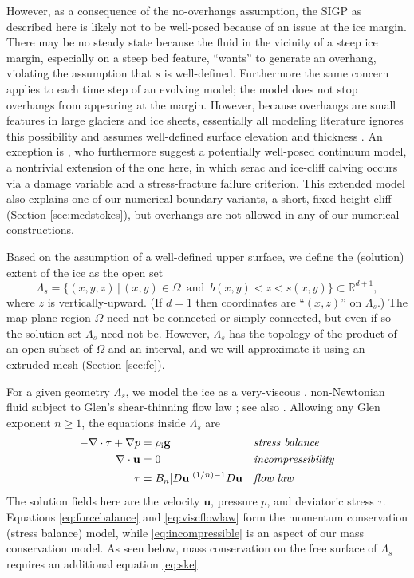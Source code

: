 \documentclass[letterpaper,final,12pt,reqno]{amsart}
\theoremstyle{claim}
\newcommand{\RR}{\mathbb{R}}
\newcommand{\bg}{\mathbf{g}}
\newcommand{\bu}{\mathbf{u}}
\newcommand{\rhoi}{\rho_{\text{i}}}
\numberwithin{equation}{section}
\numberwithin{figure}{section}
\numberwithin{table}{section}
\numberwithin{theorem}{section}
\begin{document}
However, as a consequence of the no-overhangs assumption, the SIGP as described here is likely not to be well-posed because of an issue at the ice margin.  There may be no steady state because the fluid in the vicinity of a steep ice margin, especially on a steep bed feature, ``wants'' to generate an overhang, violating the assumption that $s$ is well-defined.  Furthermore the same concern applies to each time step of an evolving model; the model does not stop overhangs from appearing at the margin.  However, because overhangs are small features in large glaciers and ice sheets, essentially all modeling literature ignores this possibility and assumes well-defined surface elevation and thickness \cite{Jouvetetal2008,Lengetal2012,WirbelJarosch2020}.  An exception is \cite{PralongFunk2005}, who furthermore suggest a potentially well-posed continuum model, a nontrivial extension of the one here, in which serac and ice-cliff calving occurs via a damage variable and a stress-fracture failure criterion.  This extended model also explains one of our numerical boundary variants, a short, fixed-height cliff (Section \ref{sec:mcdstokes}), but overhangs are not allowed in any of our numerical constructions.

Based on the assumption of a well-defined upper surface, we define the (solution) extent of the ice as the open set
\begin{equation}
\Lambda_s = \{(x,y,z)\,|\,(x,y) \in \Omega \,\text{ and }\, b(x,y) < z < s(x,y)\}  \subset \RR^{d+1}, \label{eq:lambdas}
\end{equation}
where $z$ is vertically-upward.  (If $d=1$ then coordinates are ``$(x,z)$'' on $\Lambda_s$.)  The map-plane region $\Omega$ need not be connected or simply-connected, but even if so the solution set $\Lambda_s$ need not be.  However, $\Lambda_s$ has the topology of the product of an open subset of $\Omega$ and an interval, and we will approximate it using an extruded mesh (Section \ref{sec:fe}).

For a given geometry $\Lambda_s$, we model the ice as a very-viscous \cite{Acheson1990}, non-Newtonian fluid subject to Glen's shear-thinning flow law \cite{GreveBlatter2009}; see also \cite[Chapter 1]{FowlerNg2021}.  Allowing any Glen exponent $n\ge 1$, the equations inside $\Lambda_s$ are
\begin{align}
- \nabla \cdot \tau + \nabla p &= \rhoi \bg &&\text{\emph{stress balance}} \label{eq:forcebalance} \\
\nabla \cdot \bu &= 0 &&\text{\emph{incompressibility}} \label{eq:incompressible} \\
\tau &= B_n |D\bu|^{(1/n) - 1} D\bu  &&\text{\emph{flow law}} \label{eq:viscflowlaw}
\end{align}
The solution fields here are the velocity $\bu$, pressure $p$, and deviatoric stress $\tau$.  Equations \eqref{eq:forcebalance} and \eqref{eq:viscflowlaw} form the momentum conservation (stress balance) model, while \eqref{eq:incompressible} is an aspect of our mass conservation model.  As seen below, mass conservation on the free surface of $\Lambda_s$ requires an additional equation \eqref{eq:ske}.
\end{document}
